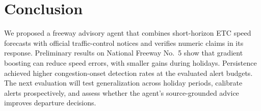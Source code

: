 \section{Conclusion}
We proposed a freeway advisory agent that combines short-horizon ETC speed forecasts with official traffic-control notices and verifies numeric claims in its response. Preliminary results on National Freeway No.~5 show that gradient boosting can reduce speed errors, with smaller gains during holidays. Persistence achieved higher congestion-onset detection rates at the evaluated alert budgets. The next evaluation will test generalization across holiday periods, calibrate alerts prospectively, and assess whether the agent's source-grounded advice improves departure decisions.
